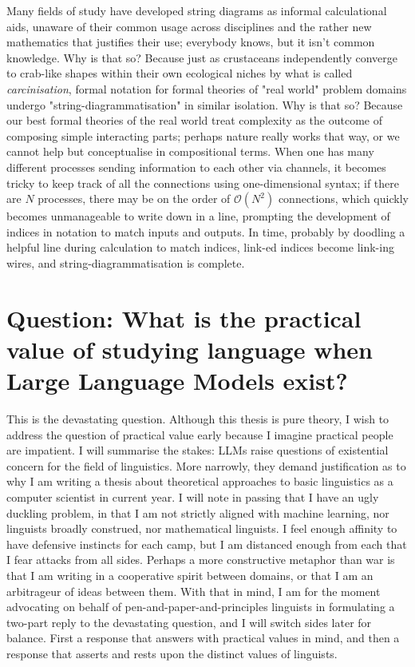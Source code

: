 Many fields of study have developed string diagrams as informal calculational aids, unaware of their common usage across disciplines and the rather new mathematics that justifies their use; everybody knows, but it isn't common knowledge. Why is that so? Because just as crustaceans independently converge to crab-like shapes within their own ecological niches by what is called \emph{carcinisation}, formal notation for formal theories of "real world" problem domains undergo "string-diagrammatisation" in similar isolation. Why is that so? Because our best formal theories of the real world treat complexity as the outcome of composing simple interacting parts; perhaps nature really works that way, or we cannot help but conceptualise in compositional terms. When one has many different processes sending information to each other via channels, it becomes tricky to keep track of all the connections using one-dimensional syntax; if there are $N$ processes, there may be on the order of $\mathcal{O}(N^2)$ connections, which quickly becomes unmanageable to write down in a line, prompting the development of indices in notation to match inputs and outputs. In time, probably by doodling a helpful line during calculation to match indices, link-ed indices become link-ing wires, and string-diagrammatisation is complete.\\

\section{\textbf{Question:} What is the practical value of studying language when Large Language Models exist?}
This is the devastating question. Although this thesis is pure theory, I wish to address the question of practical value early because I imagine practical people are impatient. I will summarise the stakes: LLMs raise questions of existential concern for the field of linguistics. More narrowly, they demand justification as to why I am writing a thesis about theoretical approaches to basic linguistics as a computer scientist in current year. I will note in passing that I have an ugly duckling problem, in that I am not strictly aligned with machine learning, nor linguists broadly construed, nor mathematical linguists. I feel enough affinity to have defensive instincts for each camp, but I am distanced enough from each that I fear attacks from all sides. Perhaps a more constructive metaphor than war is that I am writing in a cooperative spirit between domains, or that I am an arbitrageur of ideas between them. With that in mind, I am for the moment advocating on behalf of pen-and-paper-and-principles linguists in formulating a two-part reply to the devastating question, and I will switch sides later for balance. First a response that answers with practical values in mind, and then a response that asserts and rests upon the distinct values of linguists.\\

